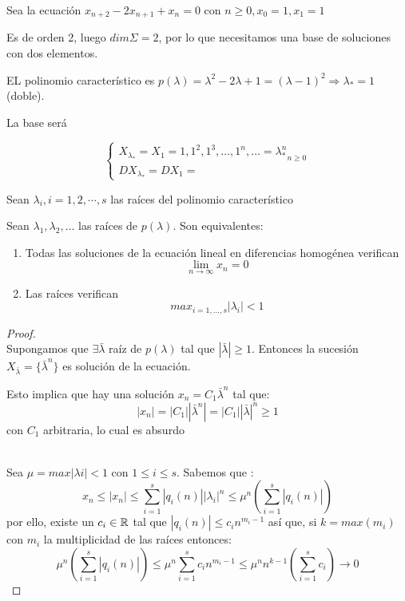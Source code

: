 \begin{ejemplo}
  Sea la ecuación $x_{n+2} - 2x_{n+1} + x_n = 0$ con
  $n \geq 0, x_0 = 1, x_1 = 1$

  Es de orden 2, luego $dim \Sigma = 2$, por lo que necesitamos una base de
  soluciones con dos elementos.

  EL polinomio característico es
  $p(\lambda) = \lambda^2 - 2\lambda + 1 = (\lambda - 1)^2 \Rightarrow
  \lambda_{\ast} = 1$ (doble).

  La base será

	$$
	\begin{cases}
          X_{\lambda_{\ast}} = X_1 = {1, 1^2, 1^3, \hdots, 1^n, \hdots} = {\lambda_{\ast}^n}_{n \geq 0}\\
          DX_{\lambda_{\ast}} = DX_1 =
	\end{cases}
	$$
      \end{ejemplo}

\begin{nth}
	Sean $\lambda_i, i=1,2,\cdots,s$ las raíces del polinomio característico
\end{nth}


 \begin{nth}
        Sean $\lambda_{1}, \lambda_{2}, \hdots$ las raíces de $p(\lambda)$. Son
        equivalentes:
        \begin{enumerate}
        \item Todas las soluciones de la ecuación lineal en diferencias
          homogénea verifican $$\lim_{n \to \infty} x_{n} = 0$$
        \item Las raíces verifican $$max_{i=1,\hdots,s}|\lambda_{i}| < 1$$
        \end{enumerate}
      \end{nth}

\begin{proof}
	\boxed{\Rightarrow}\hfill \\
	Supongamos que $\exists \bar \lambda$ raíz de $p(\lambda)$ tal que $|\bar \lambda| \geq 1$. Entonces la sucesión $X_{\bar \lambda}=\{\bar \lambda ^n\}$ es solución de la ecuación.

	Esto implica que hay una solución $x_n = C_1 \bar \lambda ^n $ tal que:
	\[
	|x_n|=|C_1||\bar \lambda ^n | = |C_1| |\bar \lambda| ^n \geq 1
	\]
	con $C_1$ arbitraria, lo cual es absurdo

	\boxed{\Leftarrow}\hfill\\
	Sea $\mu = max |\lambda i| < 1$ con $1 \leq i \leq s$.  Sabemos que :
	$$x_n \leq |x_n| \leq \sum_{i=1}^s|q_i(n)||\lambda_i|^n \leq \mu^n (\sum_{i=1}^s |q_i(n)|)$$
	por ello, existe un $c_i \in \mathbb{R}$ tal que $|q_i(n)| \leq c_i n^{m_i -1}$ así que, si $k = max (m_i)$ con $m_i$ la multiplicidad de las raíces entonces:
	\[
	\mu^n (\sum_{i=1}^s |q_i(n)|) \leq \mu^n \sum_{i=1}^s c_i n^{m_i -1} \leq \mu^n n^{k-1}(\sum_{i=1}^s c_i) \to 0
	\]
      \end{proof}

